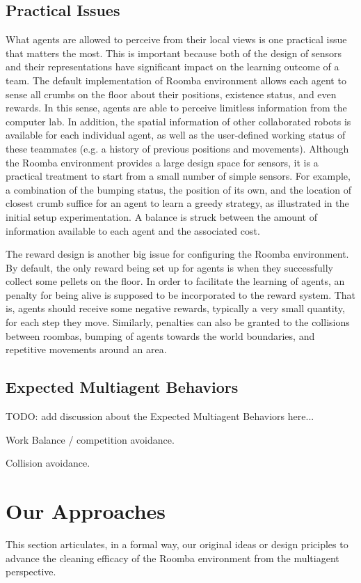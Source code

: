\documentclass[conference]{IEEEtran}
\begin{document}
\subsection{Practical Issues}
What agents are allowed to perceive from their local views is one practical
issue that matters the most. 
This is important because both of the design of sensors and their
representations have significant impact on the learning outcome of a team. 
The default implementation of Roomba environment allows each agent to sense
all crumbs on the floor about their positions, existence status, and even
rewards. 
In this sense, agents are able to perceive limitless information from the
computer lab. 
In addition, the spatial information of other collaborated robots
is available for each individual agent, as well as the user-defined working
status of these teammates (e.g. a history of previous positions and
movements).  Although the Roomba environment provides a large design space for
sensors, it is a practical treatment to start from a small number of simple
sensors. For example, a combination of the bumping status, the position of its
own, and the location of closest crumb suffice for an agent to learn a greedy
strategy, as illustrated in the initial setup experimentation.  A balance is
struck between the amount of information available to each agent and the
associated cost.

The reward design is another big issue for
configuring the Roomba environment. By default, the only reward being set up
for agents is when they successfully collect some pellets on the floor. In
order to facilitate the learning of agents, an penalty for being alive is
supposed to be incorporated to the reward system. That is, agents should
receive some negative rewards, typically a very small quantity, for each step
they move. Similarly, penalties can also be granted to the collisions between
roombas, bumping of agents towards the world boundaries, and repetitive
movements around an area.


\subsection{Expected Multiagent Behaviors}
TODO: add discussion about the Expected Multiagent Behaviors here...

Work Balance / competition avoidance. 

Collision avoidance. 

\section{Our Approaches}
This section articulates, in a formal way, our original ideas or design
priciples to advance the cleaning efficacy of the Roomba environment from the
multiagent perspective.
\end{document}
